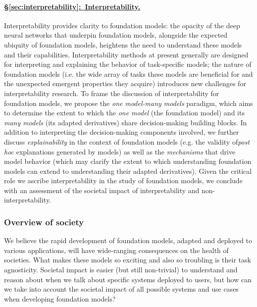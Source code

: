 \paragraph{\hyperref[sec:interpretability]{§\ref{sec:interpretability}:~Interpretability.}}

Interpretability provides clarity to foundation models: the opacity of the deep neural networks that underpin foundation models, alongside the expected ubiquity of foundation models, heightens the need to understand these models and their capabilities. Interpretability methods at present generally are designed for interpreting and explaining the behavior of task-specific models; the nature of foundation models (i.e. the wide array of tasks these models are beneficial for and the unexpected emergent properties they acquire) introduces new challenges for interpretability research. To frame the discussion of interpretability for foundation models, we propose the \textit{one model-many models} paradigm, which aims to determine the extent to which the \textit{one model} (the foundation model) and its \textit{many models} (its adapted derivatives) share decision-making building blocks. In addition to interpreting the decision-making components involved, we further discuss \textit{explainability} in the context of foundation models (e.g. the validity of\textit{post hoc} explanations generated by models) as well as the \textit{mechanisms} that drive model behavior (which may clarify the extent to which understanding foundation models can extend to understanding their adapted derivatives). Given the critical role we ascribe interpretability in the study of foundation models, we conclude with an assessment of the societal impact of interpretability and non-interpretability. 

\subsubsection{Overview of society}
\label{sec:overview-society}

We believe the rapid development of foundation models, adapted and deployed to various applications, will have wide-ranging consequences on the health of societies.  What makes these models so exciting and also so troubling is their task agnosticity.  Societal impact is easier (but still non-trivial) to understand and reason about when we talk about specific systems deployed to users, but how can we take into account the societal impact of all possible systems and use cases when developing foundation models?

